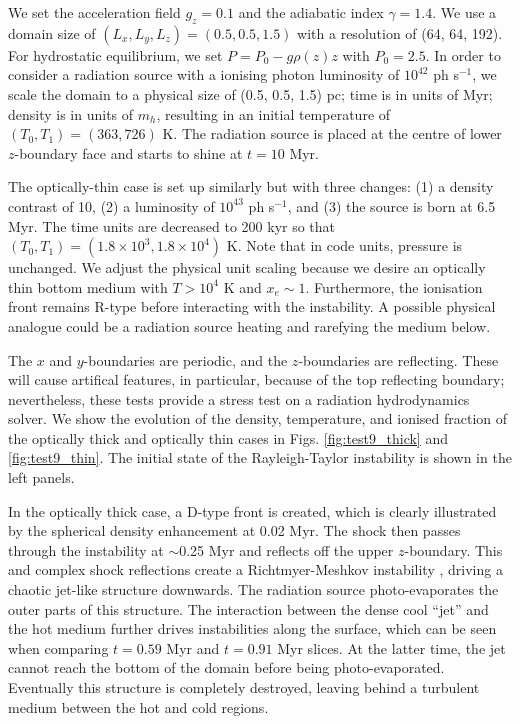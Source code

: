 \documentclass[useAMS,usenatbib]{mn2e}
\begin{document}
We set the acceleration field $g_z = 0.1$ and the adiabatic index
$\gamma = 1.4$.  We use a domain size of $(L_x, L_y, L_z) = (0.5, 0.5,
1.5)$ with a resolution of (64, 64, 192).  For hydrostatic
equilibrium, we set $P = P_0 - g \rho(z) z$ with $P_0 = 2.5$.  In
order to consider a radiation source with a ionising photon luminosity
of $10^{42}$ ph s$^{-1}$, we scale the domain to a physical size of
(0.5, 0.5, 1.5) pc; time is in units of Myr; density is in units of
$m_h$, resulting in an initial temperature of $(T_0, T_1) = (363,
726)$ K.  The radiation source is placed at the centre of lower
$z$-boundary face and starts to shine at $t = 10$ Myr.

The optically-thin case is set up similarly but with three changes:
(1) a density contrast of 10, (2) a luminosity of $10^{43}$ ph
s$^{-1}$, and (3) the source is born at 6.5 Myr.  The time units are
decreased to 200 kyr so that $(T_0, T_1) = (1.8 \times 10^3, 1.8
\times 10^4)$ K.  Note that in code units, pressure is unchanged.  We
adjust the physical unit scaling because we desire an optically thin
bottom medium with $T > 10^4$ K and $x_e \sim 1$.  Furthermore, the
ionisation front remains R-type before interacting with the
instability.  A possible physical analogue could be a radiation source
heating and rarefying the medium below.

The $x$ and $y$-boundaries are periodic, and the $z$-boundaries are
reflecting.  These will cause artifical features, in particular,
because of the top reflecting boundary; nevertheless, these tests
provide a stress test on a radiation hydrodynamics solver.  We show
the evolution of the density, temperature, and ionised fraction of the
optically thick and optically thin cases in Figs.
\ref{fig:test9_thick} and \ref{fig:test9_thin}.  The initial state of
the Rayleigh-Taylor instability is shown in the left panels.

In the optically thick case, a D-type front is created, which is
clearly illustrated by the spherical density enhancement at 0.02 Myr.
The shock then passes through the instability at $\sim$0.25 Myr and
reflects off the upper $z$-boundary.  This and complex shock
reflections create a Richtmyer-Meshkov instability \citep[see][for a
review]{RMI}, driving a chaotic jet-like structure downwards.  The
radiation source photo-evaporates the outer parts of this structure.
The interaction between the dense cool ``jet'' and the hot medium
further drives instabilities along the surface, which can be seen when
comparing $t = 0.59$ Myr and $t = 0.91$ Myr slices.  At the latter
time, the jet cannot reach the bottom of the domain before being
photo-evaporated.  Eventually this structure is completely destroyed,
leaving behind a turbulent medium between the hot and cold regions.
\end{document}
